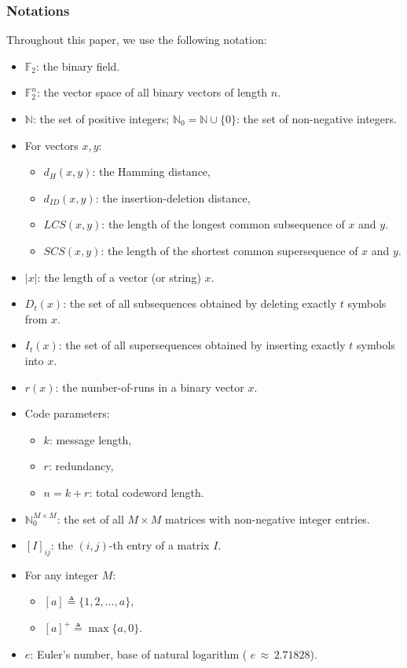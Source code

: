 \documentclass[11 pt]{article}
\numberwithin{equation}{section}
\begin{document}
    \subsubsection{Notations}
    Throughout this paper, we use the following notation:
    \begin{itemize}
    \item $\mathbb{F}_2$: the binary field.
    \item $\mathbb{F}_2^n$: the vector space of all binary vectors of length $n$.
    \item $\mathbb{N}$: the set of positive integers; $\mathbb{N}_0 = \mathbb{N} \cup \{0\}$: the set of non-negative integers.
    \item For vectors $x,y$:
    \begin{itemize}
        \item $d_H(x,y)$: the Hamming distance,
        \item $d_{ID}(x,y)$: the insertion-deletion distance,
        \item $LCS(x,y)$: the length of the longest common subsequence of $x$ and $y$.
        \item $SCS(x,y)$: the length of the shortest common supersequence of $x$ and $y$.
    \end{itemize}
    \item $|x|$: the length of a vector (or string) $x$.
    \item $D_t(x)$: the set of all subsequences obtained by deleting exactly $t$ symbols from $x$.
    \item $I_t(x)$: the set of all supersequences obtained by inserting exactly $t$ symbols into $x$.
    \item $r(x)$: the number-of-runs in a binary vector $x$.
    \item Code parameters:
    \begin{itemize}
        \item $k$: message length,
        \item $r$: redundancy,
        \item $n = k + r$: total codeword length.
    \end{itemize}
    \item $\mathbb{N}_0^{M \times M}$: the set of all $M \times M$ matrices with non-negative integer entries.
    \item $[I]_{ij}$: the $(i,j)$-th entry of a matrix $I$.
    \item For any integer $M$:
    \begin{itemize}
        \item $[a] \triangleq \{1, 2, \dots, a\}$,
        \item $[a]^+ \triangleq \max\{a, 0\}$.
    \end{itemize}
    \item $e$: Euler's number, base of natural logarithm ( $e \, \approx \, 2.71828$).
\end{itemize}
 
\end{document}
